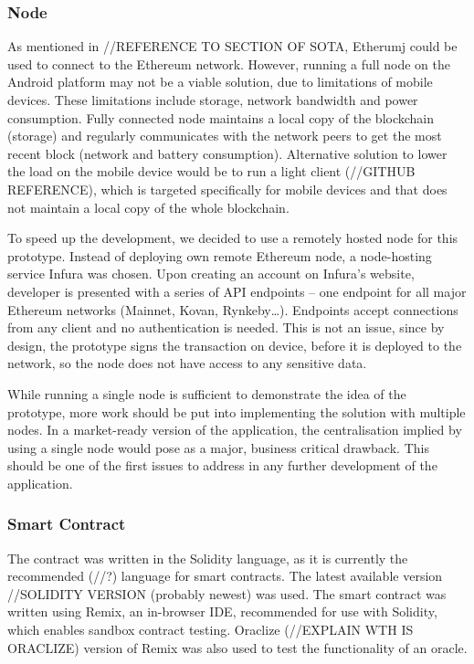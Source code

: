 \subsubsection{Node}
As mentioned in //REFERENCE TO SECTION OF SOTA, Etherumj could be used to connect to the Ethereum network. However, running a full node on the Android platform may not be a viable solution, due to limitations of mobile devices. These limitations include storage, network bandwidth and power consumption. Fully connected node maintains a local copy of the blockchain (storage) and regularly communicates with the network peers to get the most recent block (network and battery consumption). Alternative solution to lower the load on the mobile device would be to run a light client (//GITHUB REFERENCE), which is targeted specifically for mobile devices and that does not maintain a local copy of the whole blockchain.

To speed up the development, we decided to use a remotely hosted node for this prototype. Instead of deploying own remote Ethereum node, a node-hosting service Infura was chosen. Upon creating an account on Infura’s website, developer is presented with a series of API endpoints – one endpoint for all major Ethereum networks (Mainnet, Kovan, Rynkeby…). Endpoints accept connections from any client and no authentication is needed. This is not an issue, since by design, the prototype signs the transaction on device, before it is deployed to the network, so the node does not have access to any sensitive data.

While running a single node is sufficient to demonstrate the idea of the prototype, more work should be put into implementing the solution with multiple nodes. In a market-ready version of the application, the centralisation implied by using a single node would pose as a major, business critical drawback. This should be one of the first issues to address in any further development of the application.
% 
\subsubsection{Smart Contract}
The contract was written in the Solidity language, as it is currently the recommended (//?) language for smart contracts. The latest available version //SOLIDITY VERSION (probably newest) was used. The smart contract was written using Remix, an in-browser IDE, recommended for use with Solidity, which enables sandbox contract testing. Oraclize (//EXPLAIN WTH IS ORACLIZE) version of Remix was also used to test the functionality of an oracle.

